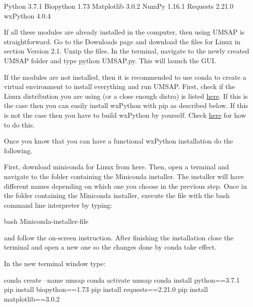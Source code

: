 Python 3.7.1
\newline
Biopython 1.73
\newline
Matplotlib 3.0.2
\newline
NumPy 1.16.1
\newline
Requests 2.21.0
\newline
wxPython 4.0.4

If all these modules are already installed in the computer, then using UMSAP is straightforward. Go to the Downloads page and download the files for Linux in section Version 2.1.  Unzip the files. In the terminal, navigate to the newly created UMSAP folder and type python UMSAP.py. This will launch the GUI.

If the modules are not installed, then it is recommended to use conda to create a virtual environment to install everything and run UMSAP. First, check if the Linux distribution you are using (or a close enough distro) is listed \href{https://extras.wxpython.org/wxPython4/extras/linux/}{here}. If this is the case then you can easily install wxPython with pip as described below. If this is not the case then you have to build wxPython by yourself. Check \href{https://wxpython.org/blog/2017-08-17-builds-for-linux-with-pip/index.html}{here} for how to do this.

Once you know that you can have a functional wxPython installation do the following.

First, download miniconda for Linux from here. Then, open a terminal and navigate to the folder containing the Miniconda installer. The installer will have different names depending on which one you choose in the previous step. Once in the folder containing the Miniconda installer, execute the file with the bash command line interpreter by typing:

bash Miniconda-installer-file

and follow the on-screen instruction. After finishing the installation close the terminal and open a new one so the changes done by conda take effect.

In the new terminal window type:

conda create --name umsap
\newline
conda activate umsap
\newline
conda install python==3.7.1
\newline
pip install biopython==1.73
\newline
pip install requests==2.21.0
\newline
pip install matplotlib==3.0.2

